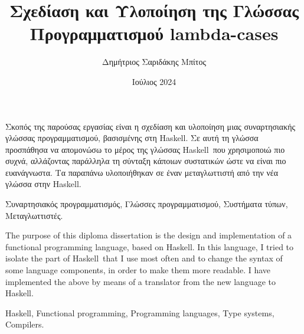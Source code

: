 \documentclass[diploma]{softlab-thesis}
\def\H{Haskell}
\begin{document}

\frontmatter

\title{Σχεδίαση και Υλοποίηση της Γλώσσας Προγραμματισμού lambda-cases}
\author{Δημήτριος Σαριδάκης Μπίτος}
\date{Ιούλιος 2024}




\maketitle



\begin{abstractgr}%
  Σκοπός της παρούσας εργασίας είναι η σχεδίαση και υλοποίηση μιας
  συναρτησιακής γλώσσας προγραμματισμού, βασισμένης στη \H. Σε αυτή
  τη γλώσσα προσπάθησα να απομονώσω το μέρος της γλώσσας \H\ που
  χρησιμοποιώ πιο συχνά, αλλάζοντας παράλληλα τη σύνταξη κάποιων
  συστατικών ώστε να είναι πιο ευανάγνωστα. Τα παραπάνω υλοποιήθηκαν
  σε έναν μεταγλωττιστή από την νέα γλώσσα στην \H.

\begin{keywordsgr}
  Συναρτησιακός προγραμματισμός,
  Γλώσσες προγραμματισμού,
  Συστήματα τύπων,
  Μεταγλωττιστές.
\end{keywordsgr}
\end{abstractgr}


\begin{abstracten}%
  The purpose of this diploma dissertation is the design and implementation
  of a functional programming language, based on \H. In this language, I
  tried to isolate the part of \H\ that I use most often and to change the
  syntax of some language components, in order to make them more readable.
  I have implemented the above by means of a translator from the new language
  to \H.

\begin{keywordsen}
  Haskell,
  Functional programming,
  Programming languages,
  Type systems,
  Compilers.
\end{keywordsen}
\end{abstracten}
\end{document}
